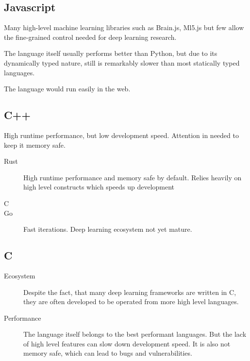 \documentclass[12pt, a4paper, titlepage]{report}
\begin{document}
{
   \center
   \subsection*{Javascript}
}
\begin{description}
   \item[Ecosystem] Many high-level machine learning libraries such as Brain.js, Ml5.js but few allow the fine-grained control needed for deep learning research.
   \item The language itself usually performs better than Python, but due to its dynamically typed nature, still is remarkably slower than most statically typed languages.
   \item[Other remarks] The language would run easily in the web.
\end{description}

{
   \center
   \subsection*{C++} High runtime performance, but low development speed. Attention in needed to keep it memory safe.
}
\begin{description}
   \item[Rust] High runtime performance and memory safe by default. Relies heavily on high level constructs which speeds up development 
   \item[C] 
   \item[Go] Fast iterations. Deep learning ecosystem not yet mature.
\end{description}

{
   \center
   \subsection*{C}
}
\begin{description}
   \item[Ecosystem] Despite the fact, that many deep learning frameworks are written in C, they are often developed to be operated from more high level languages.
   \item[Performance] The language itself belongs to the best performant languages. But the lack of high level features can slow down development speed. It is also not memory safe, which can lead to bugs and vulnerabilities.
\end{description}
\end{document}
